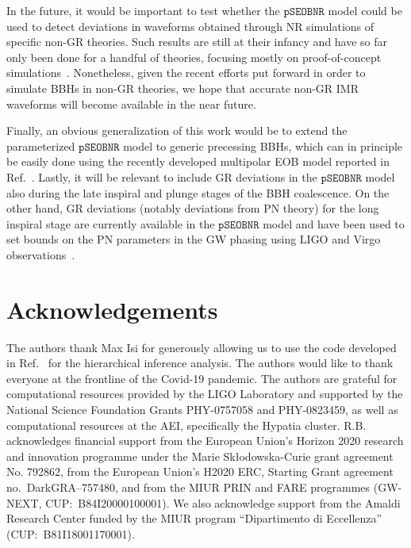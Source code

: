 \documentclass[twocolumn,prd,aps,superscriptaddress,preprintnumbers,tightenlines,showpacs,nofootinbib,eqsecnum,amsfonts,amsmath]{revtex4-1}
\newcommand{\abhi}[1]{\textcolor{Emerald}{#1}}
\newcommand{\pSEOB}{\texttt{pSEOBNR}}
\begin{document}
In the future, it would be important to test whether the $\pSEOB$  model
could be used to detect deviations in waveforms obtained through NR 
simulations of specific non-GR theories. Such results are still at their 
infancy and have so far only been done for a handful of theories, focusing mostly on proof-of-concept
simulations~\cite{Healy:2011ef,Berti:2013gfa,Cao:2013osa,Okounkova:2017yby,Hirschmann:2017psw,Witek:2018dmd,Okounkova:2019dfo,Okounkova:2019zjf,Okounkova:2020rqw,East:2020hgw}. Nonetheless,
given the recent efforts put forward in order to simulate BBHs in
non-GR theories, we hope that accurate non-GR IMR waveforms will become available in the near future.

Finally, an obvious generalization of this work would be to extend the
parameterized $\pSEOB$ model to generic precessing BBHs, which can in
principle be easily done using the recently developed multipolar EOB
model reported in Ref.~\cite{Ossokine:2020kjp}. Lastly, it will be relevant 
to include GR deviations in the $\pSEOB$ model also during the late inspiral 
and plunge stages of the BBH coalescence. On the other hand, GR deviations (notably 
deviations from PN theory) for the long inspiral stage are currently 
available in the $\pSEOB$ model and have been used to set bounds on the 
PN parameters in the GW phasing using LIGO and Virgo observations~\cite{Abbott:2018lct,
LIGOScientific:2019fpa,Abbott:2020jks}.


\section*{Acknowledgements}
\label{sec:acknowledgements}
The authors thank Max Isi for generously allowing us to use the code developed in Ref.~\cite{Isi:2019asy} for the hierarchical inference analysis. The authors would like to thank everyone at the frontline of the Covid-19 pandemic. \abhi{The authors are grateful for computational resources provided by the LIGO Laboratory and supported by the National Science Foundation Grants PHY-0757058 and PHY-0823459, as well as computational resources at the AEI, specifically the Hypatia cluster.} R.B. acknowledges financial support from the European Union's Horizon 2020 research and innovation programme under the Marie Sk\l odowska-Curie grant agreement No. 792862, from the European Union's H2020 ERC, Starting Grant agreement no.~DarkGRA--757480, and from the MIUR PRIN and FARE programmes (GW-NEXT, CUP:~B84I20000100001). We also acknowledge support from the Amaldi Research Center funded by the MIUR program ``Dipartimento di Eccellenza'' (CUP:~B81I18001170001).
\end{document}
